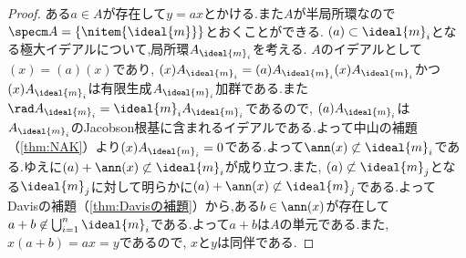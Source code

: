 \begin{proof}
	ある$a\in A$が存在して$y=ax$とかける.また$A$が半局所環なので$\specm A=\{\nitem{\ideal{m}}\}$とおくことができる. $(a)\subset\ideal{m}_i$となる極大イデアルについて,局所環$A_{\ideal{m}_i}$を考える. $A$のイデアルとして$(x)=(a)(x)$であり, $(x)A_{\ideal{m}_i}=(a)A_{\ideal{m}_i}(x)A_{\ideal{m}_i}$かつ$(x)A_{\ideal{m}_i}$は有限生成$A_{\ideal{m}_i}$加群である.また$\rad A_{\ideal{m}_i}=\ideal{m}_iA_{\ideal{m}_i}$であるので, $(a)A_{\ideal{m}_i}$は$A_{\ideal{m}_i}$のJacobson根基に含まれるイデアルである.よって中山の補題（\ref{thm:NAK}）より$(x)A_{\ideal{m}_i}=0$である.よって$\ann (x)\not\subset\ideal{m}_i$である.ゆえに$(a)+\ann (x)\not\subset\ideal{m}_i$が成り立つ.また, $(a)\not\subset\ideal{m}_j$となる$\ideal{m}_j$に対して明らかに$(a)+\ann (x)\not\subset\ideal{m}_j$である.よってDavisの補題（\ref{thm:Davisの補題}）から,ある$b\in\ann(x)$が存在して$a+b\not\in\bigcup_{i=1}^n\ideal{m}_i$である.よって$a+b$は$A$の単元である.また, $x(a+b)=ax=y$であるので, $x$と$y$は同伴である.
\end{proof}

